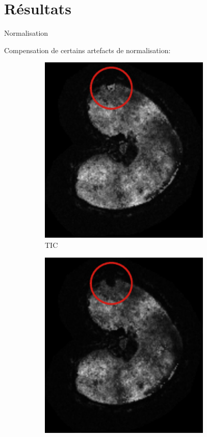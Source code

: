 \documentclass[10pt]{beamer}
\begin{document}
\section{Résultats}
\begin{frame}{Normalisation}

  Compensation de certains artefacts de normalisation:
  
  \begin{figure}[ht]
    \centering
    \begin{subfigure}[t]{0.3\textwidth}
      \centering \includegraphics[width=0.9\textwidth]{fig/real_tic}
      \caption{TIC}
      \label{subfig:real_tic}
    \end{subfigure}%
    \begin{subfigure}[t]{0.3\textwidth}
      \centering \includegraphics[width=0.9\textwidth]{fig/real_sic}

\end{subfigure}
\end{figure}
\end{frame}
\end{document}
